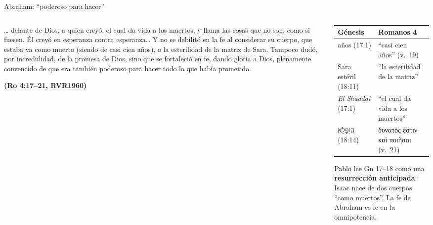 \documentclass[hyperref={bookmarks=false},aspectratio=169]{beamer}
\newcommand{\heb}[1]{\mbox{\foreignlanguage{hebrew}{#1}}}
\newcommand{\grc}[1]{\foreignlanguage{ancientgreek}{#1}}
\newcommand{\fuente}[1]{\par\hfill{\upshape\bfseries\footnotesize\textcolor{azul}{#1}}}
\newcommand{\destacar}[1]{\textbf{\textcolor{azul}{#1}}}
\begin{document}
\begin{frame}{Abraham: ``poderoso para hacer''}
\begin{columns}[c,onlytextwidth]
\begin{column}{0.56\textwidth}
\begin{cita}[fontupper=\scriptsize\itshape]\ldots{} delante de Dios, a quien creyó, el cual da vida a los muertos, y llama las cosas que no son, como si fuesen. Él creyó en esperanza contra esperanza\ldots{} Y no se debilitó en la fe al considerar su cuerpo, que estaba ya como muerto (siendo de casi cien años), o la esterilidad de la matriz de Sara. Tampoco dudó, por incredulidad, de la promesa de Dios, sino que se fortaleció en fe, dando gloria a Dios, plenamente convencido de que era también poderoso para hacer todo lo que había prometido.\fuente{(Ro 4:17--21, RVR1960)}\end{cita}
\end{column}
\begin{column}{0.42\textwidth}
\scriptsize\renewcommand{\arraystretch}{1.12}
\begin{tabular}{@{}>{\RaggedRight\arraybackslash}p{1.6cm}>{\RaggedRight\arraybackslash}p{3.3cm}@{}}
\toprule
\textbf{Génesis} & \textbf{Romanos 4} \\ \midrule
99 años (17:1) & ``casi cien años'' (v.~19) \\
Sara estéril (18:11) & ``la esterilidad de la matriz'' \\
\emph{El Shaddai} (17:1) & ``el cual da vida a los muertos'' \\
\heb{הֲיִפָּלֵא} (18:14) & \grc{δυνατός ἐστιν καὶ ποιῆσαι} (v.~21) \\
\bottomrule
\end{tabular}\par\medskip
\small Pablo lee Gn 17--18 como una \destacar{resurrección anticipada}: Isaac nace de dos cuerpos ``como muertos''. La fe de Abraham es fe en la omnipotencia.
\end{column}
\end{columns}
\end{frame}
\end{document}
